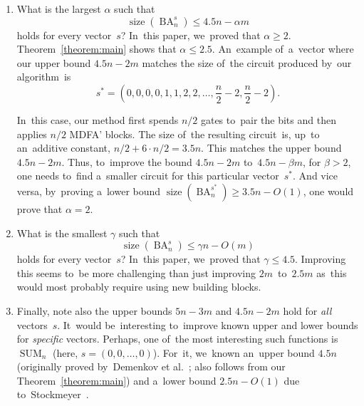 \documentclass[sigconf, review, anonymous]{acmart}
\DeclareMathOperator{\SUM}{SUM}
\DeclareMathOperator{\BA}{BA}
\DeclareMathOperator{\size}{size}
\begin{document}
\begin{enumerate}
	\item What is the largest $\alpha$ such that 
	\[\size(\BA_n^s) \le 4.5n-\alpha m\]
	holds for every vector~$s$? In~this paper, we~proved that $\alpha \ge 2$.
	Theorem~\ref{theorem:main} shows that $\alpha \le 2.5$. An~example 
	of~a~vector where our upper bound $4.5n-2m$ matches the size of~the circuit 
	produced by~our algorithm~is
	\[s^*=\left(0,0,0,0,1,1,2,2,\dotsc,\frac{n}{2}-2, \frac{n}{2}-2\right).\]
	\begin{center}
	\end{center}
	In~this case, our method first spends $n/2$ gates to~pair the bits and then applies $n/2$ MDFA' blocks. The size of~the resulting circuit~is, up~to an~additive constant, $n/2+6\cdot n/2=3.5n$. This matches the upper bound $4.5n-2m$. Thus, to~improve the bound $4.5n-2m$ to~$4.5n-\beta m$, for $\beta > 2$, one needs to~find a~smaller circuit for this particular vector~$s^*$.
	And vice versa, by~proving a~lower bound $\size(\BA_n^{s^*}) \ge 3.5n-O(1)$,
	one would prove that $\alpha=2$.
	
	\item What is the smallest $\gamma$ such that 
	\[\size(\BA_n^s) \le \gamma n-O(m)\]
	holds for every vector~$s$? In~this paper,
	we~proved that $\gamma \le 4.5$.
	Improving this seems to~be more challenging than just improving $2m$~to~$2.5m$ as~this would most probably require using new building blocks. 
	
	\item Finally, note also the upper bounds $5n-3m$ and $4.5n-2m$ hold for \emph{all} vectors~$s$.
	It~would be~interesting to~improve known upper and lower bounds for \emph{specific} vectors. Perhaps, one of~the most interesting such functions is~$\SUM_n$ (here, $s=(0,0,\dotsc,0)$). For~it, we~known an~upper bound $4.5n$ (originally proved 
	by~Demenkov et al.~\cite{DBLP:journals/ipl/DemenkovKKY10}; also follows from our Theorem~\ref{theorem:main}) and a~lower bound $2.5n-O(1)$ due to~Stockmeyer~\cite{DBLP:journals/mst/Stockmeyer77}. 
\end{enumerate}
\end{document}
